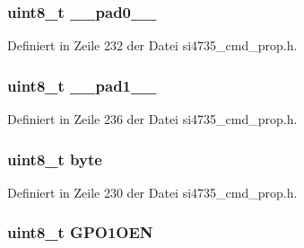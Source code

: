 \subsubsection[{\+\_\+\+\_\+pad0\+\_\+\+\_\+}]{\setlength{\rightskip}{0pt plus 5cm}uint8\+\_\+t \+\_\+\+\_\+pad0\+\_\+\+\_\+}\label{unionfm__gpio__ctl__arg1_a8b4eebe79ded0459acec2f4950102ba3}


Definiert in Zeile 232 der Datei si4735\+\_\+cmd\+\_\+prop.\+h.

\hypertarget{unionfm__gpio__ctl__arg1_a77f12d2e278bd5c07712648ac0df5e08}{}
\subsubsection[{\+\_\+\+\_\+pad1\+\_\+\+\_\+}]{\setlength{\rightskip}{0pt plus 5cm}uint8\+\_\+t \+\_\+\+\_\+pad1\+\_\+\+\_\+}\label{unionfm__gpio__ctl__arg1_a77f12d2e278bd5c07712648ac0df5e08}


Definiert in Zeile 236 der Datei si4735\+\_\+cmd\+\_\+prop.\+h.

\hypertarget{unionfm__gpio__ctl__arg1_a96f44d20f1dbf1c8785a7bc99a46164c}{}
\subsubsection[{byte}]{\setlength{\rightskip}{0pt plus 5cm}uint8\+\_\+t byte}\label{unionfm__gpio__ctl__arg1_a96f44d20f1dbf1c8785a7bc99a46164c}


Definiert in Zeile 230 der Datei si4735\+\_\+cmd\+\_\+prop.\+h.

\hypertarget{unionfm__gpio__ctl__arg1_a42407c116374825855d895ede3d3fef2}{}
\subsubsection[{G\+P\+O1\+O\+E\+N}]{\setlength{\rightskip}{0pt plus 5cm}uint8\+\_\+t G\+P\+O1\+O\+E\+N}\label{unionfm__gpio__ctl__arg1_a42407c116374825855d895ede3d3fef2}


